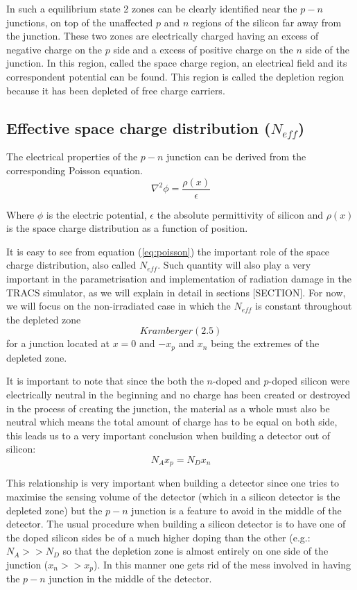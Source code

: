 In such a equilibrium state 2 zones can be clearly identified near the $p-n$ junctions, on top of the unaffected $p$ and $n$ regions of the silicon far away from the junction. These two zones are electrically charged having an excess of negative charge on the $p$ side and a excess of positive charge on the $n$ side of the junction. In this region, called the space charge region, an electrical field and its correspondent potential can be found. This region is called the depletion region because it has been depleted of free charge carriers.

\subsection{Effective space charge distribution ($N_{eff}$)} 

The electrical properties of the $p-n$ junction can be derived from the corresponding Poisson equation. 
\begin{equation}
\nabla^2 \phi = \frac{\rho(x)}{\epsilon} 
\label{eq:poisson}
\end{equation}

Where $\phi$ is the electric potential, $\epsilon$ the absolute permittivity of silicon and $\rho(x)$ is the space charge distribution as a function of position.

It is easy to see from equation (\ref{eq:poisson}) the important role of the space charge distribution, also called $N_{eff}$. Such quantity will also play a very important in the parametrisation and implementation of radiation damage in the TRACS simulator, as we will explain in detail in sections [SECTION]. For now, we will focus on the non-irradiated case in which the $N_{eff}$ is constant throughout the depleted zone \[ Kramberger (2.5)\] for a junction located at $x=0$ and $-x_p$ and $x_n$ being the extremes of the depleted zone.

It is important to note that since the both the $n$-doped and $p$-doped silicon were electrically neutral in the beginning and no charge has been created or destroyed in the process of creating the junction, the material as a whole must also be neutral which means the total amount of charge has to be equal on both side, this leads us to a very important conclusion when building a detector out of silicon: \[N_A x_p = N_D x_n\] 

This relationship is very important when building a detector since one tries to maximise the sensing volume of the detector (which in a silicon detector is the depleted zone) but the $p-n$ junction is a feature to avoid in the middle of the detector. The usual procedure when building a silicon detector is to have one of the doped silicon sides be of a much higher doping than the other (e.g.: $N_A >> N_D$  so that the depletion zone is almost entirely on one side of the junction ($x_n >> x_p$). In this manner one gets rid of the mess involved in having the $p-n$ junction in the middle of the detector.

